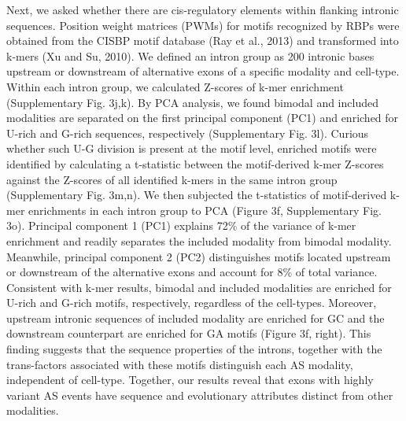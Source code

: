 Next, we asked whether there are cis-regulatory elements within flanking intronic sequences. Position weight matrices (PWMs) for motifs recognized by RBPs were obtained from the CISBP motif database (Ray et al., 2013) and transformed into k-mers (Xu and Su, 2010). We defined an intron group as 200 intronic bases upstream or downstream of alternative exons of a specific modality and cell-type. Within each intron group, we calculated Z-scores of k-mer enrichment (Supplementary Fig. 3j,k). By PCA analysis, we found bimodal and included modalities are separated on the first principal component (PC1) and enriched for U-rich and G-rich sequences, respectively (Supplementary Fig. 3l). Curious whether such U-G division is present at the motif level, enriched motifs were identified by calculating a t-statistic between the motif-derived k-mer Z-scores against the Z-scores of all identified k-mers in the same intron group (Supplementary Fig. 3m,n). We then subjected the t-statistics of motif-derived k-mer enrichments in each intron group to PCA (Figure 3f, Supplementary Fig. 3o). Principal component 1 (PC1) explains 72\% of the variance of k-mer enrichment and readily separates the included modality from bimodal modality. Meanwhile, principal component 2 (PC2) distinguishes motifs located upstream or downstream of the alternative exons and account for 8\% of total variance. Consistent with k-mer results, bimodal and included modalities are enriched for U-rich and G-rich motifs, respectively, regardless of the cell-types. Moreover, upstream intronic sequences of included modality are enriched for GC and the downstream counterpart are enriched for GA motifs (Figure 3f, right). This finding suggests that the sequence properties of the introns, together with the trans-factors associated with these motifs distinguish each AS modality, independent of cell-type. Together, our results reveal that exons with highly variant AS events have sequence and evolutionary attributes distinct from other modalities.

